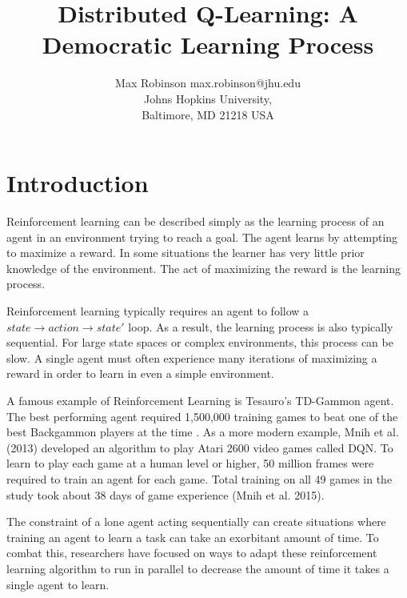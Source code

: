 \documentclass[jair,twoside,11pt,theapa]{article}
\begin{document}
\title{Distributed Q-Learning: A Democratic Learning Process}

\author{\name Max Robinson \email max.robinson@jhu.edu \\
       \addr Johns Hopkins University,\\
       Baltimore, MD 21218 USA
   }


\maketitle

\begin{abstract}

\end{abstract}

\section{Introduction}
\label{Introduction}
Reinforcement learning can be described simply as the learning process of an agent in an environment trying to reach a goal. 
The agent learns by attempting to maximize a reward. In some situations the learner has very little prior knowledge of the environment. 
The act of maximizing the reward is the learning process.

Reinforcement learning typically requires an agent to follow a $state \to action \to state'$ loop. As a result, the learning process is also typically sequential. 
For large state spaces or complex environments, this process can be slow. A single agent must often experience many iterations of maximizing 
a reward in order to learn in even a simple environment.

A famous example of Reinforcement Learning is Tesauro's TD-Gammon agent.
The best performing agent required 1,500,000 training games to beat one of the best Backgammon players at the time \cite{Tesauro:1995:TDL:203330.203343}.
As a more modern example, Mnih et al. (2013) \nocite{Mnih2013} developed an algorithm to play Atari 2600 video games called DQN. To learn to play each game at a human level or higher,
50 million frames were required to train an agent for each game. Total training on all 49 games in the study took about 38 days of game experience (Mnih et al. 2015). 

The constraint of a lone agent acting sequentially can create situations where training an agent to learn a task can take an exorbitant amount of time. 
To combat this, researchers have focused on ways to adapt these reinforcement learning algorithm to run in parallel to decrease the amount of time it takes a single agent to learn. 
\end{document}
